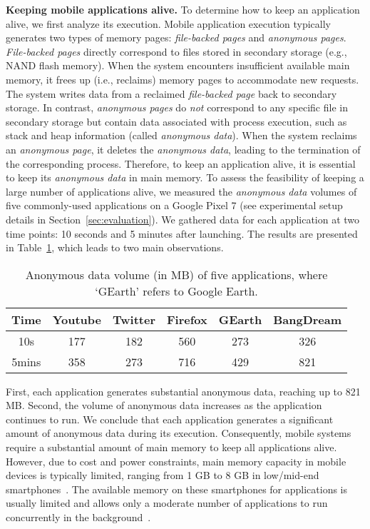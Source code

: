 \noindent\textbf{Keeping mobile applications alive.} 
To determine how to keep an application alive, we first analyze its execution. Mobile application execution typically generates two types of memory pages: \emph{file-backed pages} and \emph{anonymous pages}. 
\emph{File-backed pages} directly correspond to files stored in secondary storage (e.g., NAND flash memory). When the system encounters insufficient available main memory, it frees up (i.e., reclaims)  memory pages to accommodate new requests. The system writes data from a reclaimed \emph{file-backed page} back to secondary storage. In contrast, \emph{anonymous pages} do \emph{not} correspond to any specific file in secondary storage but contain data associated with process execution, such as stack and heap information (called \emph{anonymous data}). When the system reclaims an \emph{anonymous page}, it deletes the \emph{anonymous data}, leading to the termination of the corresponding process. Therefore, to keep an application alive, it is essential to keep its \emph{anonymous data} in main memory.
To assess the feasibility of keeping a large number of applications alive, we measured the \emph{anonymous data} volumes of five commonly-used applications on a Google Pixel 7 (see experimental setup details in Section~\ref{sec:evaluation}).
We gathered data for each application at two time points: 10 seconds and 5 minutes after launching. The results are presented in Table~\ref{tab:anonymous}, which leads to two main observations.



\begin{table}[h!]
\vspace{0.3em}
\caption{Anonymous data volume (in MB) of five applications, where `GEarth' refers to Google Earth.}
\label{tab:anonymous}
\centering
\footnotesize
\begin{tabular}{c||c|c|c|c|c}
\hline
\textbf{Time}&\textbf{Youtube} & \textbf{Twitter}& \textbf{Firefox} & \textbf{GEarth}&\textbf{BangDream}\\ \hline
\hline
10s&177&182&560&273&326\\\hline
5mins&358&273&716&429&821\\\hline
\end{tabular}
\end{table}

First, each application generates substantial anonymous data, reaching up to 821 MB. Second, the volume of anonymous data increases as the application continues to run.
We conclude that each application generates a significant amount of anonymous data during its execution. Consequently, mobile systems require a substantial amount of main memory to keep all applications alive. However, due to cost and power constraints, main memory capacity in mobile devices is typically limited, ranging from 1 GB to 8 GB in low/mid-end smartphones~\cite{li2023ice}.  
The available memory on these smartphones for applications is usually limited and allows only a moderate number of applications to run concurrently in the background~\cite{end2024more,lebeck2020end}.

